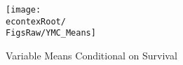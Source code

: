 \begin{figure}[]
	\centerline{\texttt{[image: \\econtexRoot/\\FigsRaw/YMC\_Means]}}
	\caption{Variable Means Conditional on Survival}
	\label{fig:YMC}
\end{figure}

